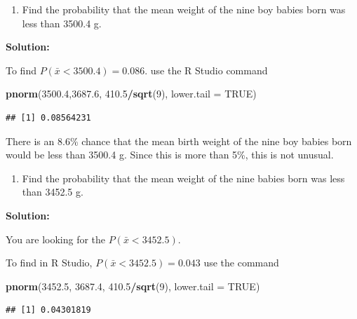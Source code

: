 \documentclass[
]{book}
\newenvironment{Shaded}{\begin{snugshade}}{\end{snugshade}}
\newcommand{\DataTypeTok}[1]{\textcolor[rgb]{0.13,0.29,0.53}{#1}}
\newcommand{\DecValTok}[1]{\textcolor[rgb]{0.00,0.00,0.81}{#1}}
\newcommand{\FloatTok}[1]{\textcolor[rgb]{0.00,0.00,0.81}{#1}}
\newcommand{\KeywordTok}[1]{\textcolor[rgb]{0.13,0.29,0.53}{\textbf{#1}}}
\newcommand{\NormalTok}[1]{#1}
\newcommand{\OperatorTok}[1]{\textcolor[rgb]{0.81,0.36,0.00}{\textbf{#1}}}
\newcommand{\OtherTok}[1]{\textcolor[rgb]{0.56,0.35,0.01}{#1}}
\providecommand{\tightlist}{%
  \setlength{\itemsep}{0pt}\setlength{\parskip}{0pt}}
\begin{document}
\begin{enumerate}
\def\labelenumi{\alph{enumi}.}
\setcounter{enumi}{4}
\tightlist
\item
  Find the probability that the mean weight of the nine boy babies born was less than 3500.4 g.
\end{enumerate}

\textbf{Solution:}

To find \(P(\bar{x}<3500.4)=0.086\). use the R Studio command

\begin{Shaded}
\begin{Highlighting}[]
\KeywordTok{pnorm}\NormalTok{(}\FloatTok{3500.4}\NormalTok{,}\FloatTok{3687.6}\NormalTok{, }\FloatTok{410.5}\OperatorTok{/}\KeywordTok{sqrt}\NormalTok{(}\DecValTok{9}\NormalTok{), }\DataTypeTok{lower.tail =} \OtherTok{TRUE}\NormalTok{)}
\end{Highlighting}
\end{Shaded}

\begin{verbatim}
## [1] 0.08564231
\end{verbatim}

There is an 8.6\% chance that the mean birth weight of the nine boy babies born would be less than 3500.4 g. Since this is more than 5\%, this is not unusual.

\begin{enumerate}
\def\labelenumi{\alph{enumi}.}
\setcounter{enumi}{5}
\tightlist
\item
  Find the probability that the mean weight of the nine babies born was less than 3452.5 g.
\end{enumerate}

\textbf{Solution:}

You are looking for the \(P(\bar{x}<3452.5)\).

To find in R Studio, \(P(\bar{x}<3452.5)=0.043\) use the command

\begin{Shaded}
\begin{Highlighting}[]
\KeywordTok{pnorm}\NormalTok{(}\FloatTok{3452.5}\NormalTok{, }\FloatTok{3687.4}\NormalTok{, }\FloatTok{410.5}\OperatorTok{/}\KeywordTok{sqrt}\NormalTok{(}\DecValTok{9}\NormalTok{), }\DataTypeTok{lower.tail =} \OtherTok{TRUE}\NormalTok{)}
\end{Highlighting}
\end{Shaded}

\begin{verbatim}
## [1] 0.04301819
\end{verbatim}
\end{document}

